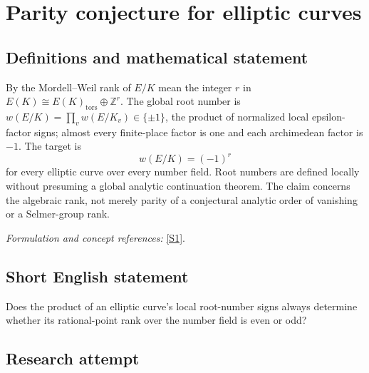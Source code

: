 \documentclass[11pt,a4paper]{article}
\newcommand{\Z}{\mathbb{Z}}
\newcommand{\sref}[2]{\hyperlink{source:#1:#2}{[S#2]}}
\newif\ifshowcatalogue
\newcommand{\cataloguescope}[1]{\ifshowcatalogue
 \paragraph{Exact scope in the supplied catalogue.}
 \begin{quote}\small #1\end{quote}\fi}
\numberwithin{equation}{section}
\begin{document}
\setcounter{section}{195}
\clearpage
\section{\texorpdfstring{Parity conjecture for elliptic curves}{Parity conjecture for elliptic curves}}\label{196}
\subsection{Definitions and mathematical statement}
By the Mordell--Weil rank of $E/K$ mean the integer $r$ in
$E(K)\cong E(K)_{\mathrm{tors}}\oplus\Z^r$. The global root number is
$w(E/K)=\prod_v w(E/K_v)\in\{\pm1\}$, the product of normalized local epsilon-factor signs; almost every finite-place factor is one and each archimedean factor is $-1$. The target is
\[
 w(E/K)=(-1)^r
\]
for every elliptic curve over every number field. Root numbers are defined locally without presuming a global analytic continuation theorem. The claim concerns the algebraic rank, not merely parity of a conjectural analytic order of vanishing or a Selmer-group rank.
\par\smallskip\textit{Formulation and concept references:} \sref{196}{1}.
\cataloguescope{For every number field K and every elliptic curve E/K, is w(E/K)=(-1)\textasciicircum{}rank\_Z E(K), where rank\_Z E(K) is the Mordell-Weil rank and w(E/K)=product\_v w(E/K\_v) is the global root number? The local factors are the usual Weil-Deligne root numbers at finite places, equal to1 at all but finitely many places, and -1 at every archimedean place; their definition does not assume analytic continuation of L(E/K,s).}
\subsection{Short English statement}
Does the product of an elliptic curve's local root-number signs always determine whether its rational-point rank over the number field is even or odd?
\subsection{Research attempt}
\end{document}
